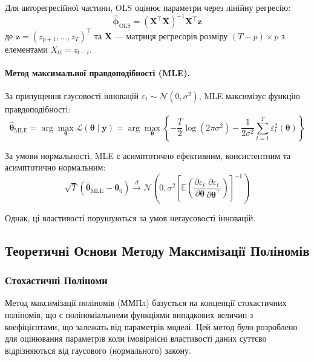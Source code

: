 \documentclass[12pt,a4paper]{article}
\begin{document}
Для авторегресійної частини, OLS оцінює параметри через лінійну регресію:
\begin{equation}
\label{eq:ols}
\hat{\boldsymbol{\phi}}_{\text{OLS}} = (\mathbf{X}^\top \mathbf{X})^{-1} \mathbf{X}^\top \mathbf{z}
\end{equation}
де $\mathbf{z} = (z_{p+1}, \ldots, z_T)^\top$ та $\mathbf{X}$ --- матриця регресорів розміру $(T-p) \times p$ з елементами $X_{ti} = z_{t-i}$.

\paragraph{Метод максимальної правдоподібності (MLE).}

За припущення гаусовості інновацій $\varepsilon_t \sim \mathcal{N}(0, \sigma^2)$, MLE максимізує функцію правдоподібності:
\begin{equation}
\label{eq:mle}
\hat{\boldsymbol{\theta}}_{\text{MLE}} = \arg\max_{\boldsymbol{\theta}} \mathcal{L}(\boldsymbol{\theta} \mid \mathbf{y}) = \arg\max_{\boldsymbol{\theta}} \left\{ -\frac{T}{2} \log(2\pi\sigma^2) - \frac{1}{2\sigma^2} \sum_{t=1}^{T} \varepsilon_t^2(\boldsymbol{\theta}) \right\}
\end{equation}

За умови нормальності, MLE є асимптотично ефективним, консистентним та асимптотично нормальним:
\begin{equation}
\label{eq:mle_asymptotic}
\sqrt{T}(\hat{\boldsymbol{\theta}}_{\text{MLE}} - \boldsymbol{\theta}_0) \xrightarrow{d} \mathcal{N}\left(0, \sigma^2 \left[\mathbb{E}\left(\frac{\partial \varepsilon_t}{\partial \boldsymbol{\theta}} \frac{\partial \varepsilon_t}{\partial \boldsymbol{\theta}^\top}\right)\right]^{-1}\right)
\end{equation}

Однак, ці властивості порушуються за умов негаусовості інновацій.

\subsection{Теоретичні Основи Методу Максимізації Поліномів}
\label{subsec:pmm_theory}

\subsubsection{Стохастичні Поліноми}

Метод максимізації поліномів (ММПл) базується на концепції стохастичних поліномів, що є поліноміальними функціями випадкових величин з коефіцієнтами, що залежать від параметрів моделі. Цей метод було розроблено для оцінювання параметрів коли імовірнісні властивості даних суттєво відрізняються від гаусового (нормального) закону.
\end{document}
